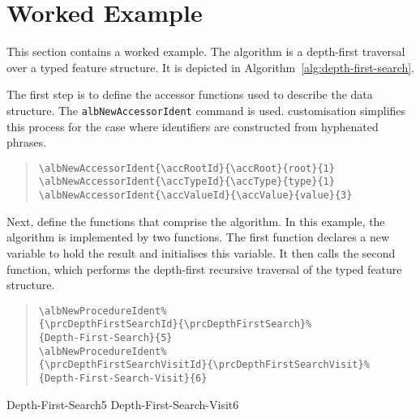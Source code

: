 \documentclass[11pt,a4paper,oneside,titlepage]{alb-corp}
\begin{document}

\section{Worked Example}
\label{sec:alb-algorithms-documentation:worked-example}

This section contains a worked example.  The algorithm is a depth-first
traversal over a typed feature structure.  It is depicted in
Algorithm~\ref{alg:depth-first-search}.

The first step is to define the accessor functions used to describe the
data structure.  The \texttt{albNewAccessorIdent} command is used.
\AUCTeX{} customisation simplifies this process for the case where
identifiers are constructed from hyphenated phrases.

\begin{quote}
\begin{verbatim}
\albNewAccessorIdent{\accRootId}{\accRoot}{root}{1}
\albNewAccessorIdent{\accTypeId}{\accType}{type}{1}
\albNewAccessorIdent{\accValueId}{\accValue}{value}{3}
\end{verbatim}
\end{quote}


Next, define the functions that comprise the algorithm.  In this
example, the algorithm is implemented by two functions.  The first
function declares a new variable to hold the result and initialises this
variable.  It then calls the second function, which performs the
depth-first recursive traversal of the typed feature structure.

\begin{quote}
\begin{verbatim}
\albNewProcedureIdent%
{\prcDepthFirstSearchId}{\prcDepthFirstSearch}%
{Depth-First-Search}{5}
\albNewProcedureIdent%
{\prcDepthFirstSearchVisitId}{\prcDepthFirstSearchVisit}%
{Depth-First-Search-Visit}{6}
\end{verbatim}
\end{quote}

\albNewProcedureIdent%
{\prcDepthFirstSearchId}{\prcDepthFirstSearch}%
{Depth-First-Search}{5}
\albNewProcedureIdent%
{\prcDepthFirstSearchVisitId}{\prcDepthFirstSearchVisit}%
{Depth-First-Search-Visit}{6}
\end{document}
